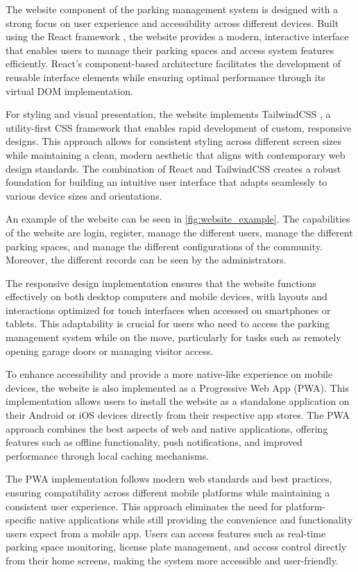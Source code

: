 The website component of the parking management system is designed with a strong focus on user experience and accessibility across different devices. Built using the React framework \autocite{react}, the website provides a modern, interactive interface that enables users to manage their parking spaces and access system features efficiently. React's component-based architecture facilitates the development of reusable interface elements while ensuring optimal performance through its virtual DOM implementation.

For styling and visual presentation, the website implements TailwindCSS \autocite{tailwindcss}, a utility-first CSS framework that enables rapid development of custom, responsive designs. This approach allows for consistent styling across different screen sizes while maintaining a clean, modern aesthetic that aligns with contemporary web design standards. The combination of React and TailwindCSS creates a robust foundation for building an intuitive user interface that adapts seamlessly to various device sizes and orientations.

An example of the website can be seen in \cref{fig:website_example}. The capabilities of the website are login, register, manage the different users, manage the different parking spaces, and manage the different configurations of the community. Moreover, the different records can be seen by the administrators.

The responsive design implementation ensures that the website functions effectively on both desktop computers and mobile devices, with layouts and interactions optimized for touch interfaces when accessed on smartphones or tablets. This adaptability is crucial for users who need to access the parking management system while on the move, particularly for tasks such as remotely opening garage doors or managing visitor access.

To enhance accessibility and provide a more native-like experience on mobile devices, the website is also implemented as a Progressive Web App (PWA). This implementation allows users to install the website as a standalone application on their Android or iOS devices directly from their respective app stores. The PWA approach combines the best aspects of web and native applications, offering features such as offline functionality, push notifications, and improved performance through local caching mechanisms.

The PWA implementation follows modern web standards and best practices, ensuring compatibility across different mobile platforms while maintaining a consistent user experience. This approach eliminates the need for platform-specific native applications while still providing the convenience and functionality users expect from a mobile app. Users can access features such as real-time parking space monitoring, license plate management, and access control directly from their home screens, making the system more accessible and user-friendly.

